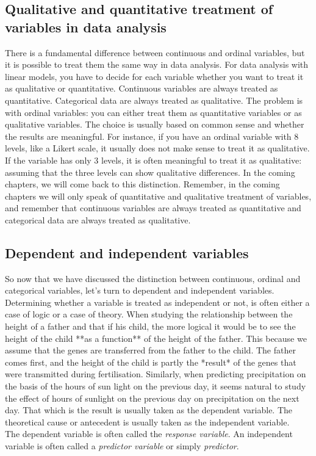 \subsection{Qualitative and quantitative treatment of variables in data analysis}
There is a fundamental difference between continuous and ordinal variables, but it is possible to treat them the same way in data analysis. For data analysis with linear models, you have to decide for each variable whether you want to treat it as qualitative or quantitative. Continuous variables are always treated as quantitative. Categorical data are always treated as qualitative. The problem is with ordinal variables: you can either treat them as quantitative variables or as qualitative variables. The choice is usually based on common sense and whether the results are meaningful. For instance, if you have an ordinal variable with 8 levels, like a Likert scale, it usually does not make sense to treat it as qualitative. If the variable has only 3 levels, it is often meaningful to treat it as qualitative: assuming that the three levels can show qualitative differences. In the coming chapters, we will come back to this distinction. Remember, in the coming chapters we will only speak of quantitative and qualitative treatment of variables, and remember that continuous variables are always treated as quantitative and categorical data are always treated as qualitative.


\subsection{Dependent and independent variables}
So now that we have discussed the distinction between continuous, ordinal and categorical variables, let's turn to dependent and independent variables. Determining whether a variable is treated as independent or not, is often either a case of logic or a case of theory. When studying the relationship between the height of a father and that if his child, the more logical it would be to see the height of the child **as a function** of the height of the father. This because we assume that the genes are transferred from the father to the child. The father comes first, and the height of the child is partly the *result* of the genes that were transmitted during fertilisation. Similarly, when predicting precipitation on the basis of the hours of sun light on the previous day, it seems natural to study the effect of hours of sunlight on the previous day on precipitation on the next day. That which is the result is usually taken as the dependent variable. The theoretical cause or antecedent is usually taken as the independent variable. \\
The dependent variable is often called the \textit{response variable}. An independent variable is often called a \textit{predictor variable} or simply \textit{predictor}.

